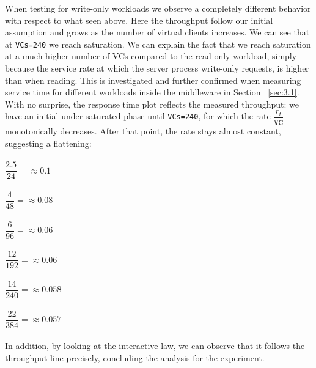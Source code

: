 \documentclass[11pt,a4paper]{article}
\begin{document}
When testing for write-only workloads we observe a completely different behavior with respect to what seen above. Here the throughput follow our initial assumption and grows as the number of virtual clients increases. We can see that at \texttt{VCs=240} we reach saturation. We can explain the fact that we reach saturation at a much higher number of VCs compared to the read-only workload, simply because the service rate at which the server process write-only requests, is higher than when reading. This is investigated and further confirmed when measuring service time for different workloads inside the middleware in Section ~\ref{sec:3.1}.
With no surprise, the response time plot reflects the measured throughput: we have an initial under-saturated phase until \texttt{VCs=240}, for which the rate $\dfrac{r_t}{\texttt{VC}}$ monotonically decreases.
After that point, the rate stays almost constant, suggesting a flattening:\\\\
$\dfrac{2.5}{24}= \approx 0.1$\\\\
$\dfrac{4}{48}= \approx 0.08$\\\\
$\dfrac{6}{96}= \approx 0.06$\\\\
$\dfrac{12}{192}= \approx 0.06$\\\\
$\dfrac{14}{240}= \approx 0.058$\\\\
$\dfrac{22}{384}= \approx 0.057$\\\\
In addition, by looking at the interactive law, we can observe that it follows the throughput line precisely, concluding the analysis for the experiment.
\end{document}
